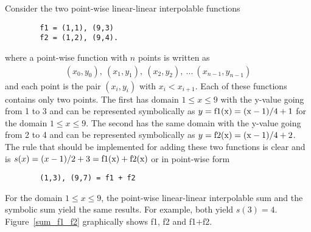 \documentclass[11pt]{article}
\begin{document}
Consider the two point-wise linear-linear interpolable functions
\begin{verbatim}
        f1 = (1,1), (9,3)
        f2 = (1,2), (9,4).
\end{verbatim}
where a point-wise function with $n$ points is written as
\begin{eqnarray}
        (x_0,y_0), \ (x_1,y_1), \ (x_2,y_2), \ ... \ (x_{n-1},y_{n-1}) \nonumber
\end{eqnarray}
and each point is the pair $(x_i,y_i)$ with $x_i < x_{i+1}$.
Each of these functions contains only two points. The first has domain $1 \le x \le 9$ with the y-value 
going from 1 to 3 and can be represented symbolically as $y = \rm{f1}(x) = ( x - 1 ) / 4 + 1$ for the domain $1 \le x \le 9$. 
The second has the same domain with the y-value going from 2 to 4 and can be represented symbolically as $y = \rm{f2}(x) = ( x - 1 ) / 4 + 2$. 
The rule that should be implemented for adding these two functions is clear and is
$s(x) = ( x - 1 ) / 2 + 3 = \rm{f1}(x) + \rm{f2}(x)$ or in point-wise form
\begin{verbatim}
        (1,3), (9,7) = f1 + f2
\end{verbatim}
For the domain $1 \le x \le 9$, the point-wise linear-linear interpolable sum and the symbolic sum yield the
same results. For example, both yield $s(3) = 4$. Figure~\ref{sum_f1_f2} graphically shows f1, f2 and f1$ + $f2.

\end{document}
